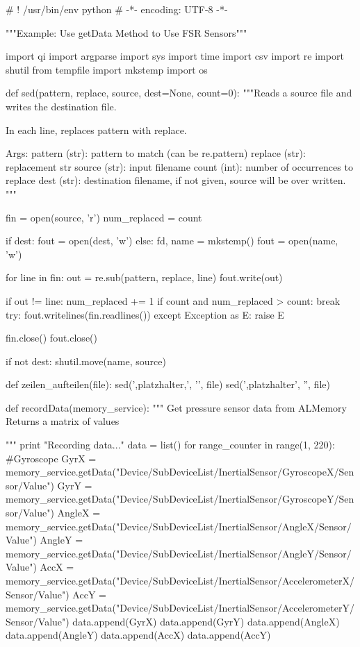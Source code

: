 	\begin{python} [caption={Pythonprogramm für Messaufnahmen}, label=Messungscode]
		# ! /usr/bin/env python
		# -*- encoding: UTF-8 -*-
		
		"""Example: Use getData Method to Use FSR Sensors"""
		
		import qi
		import argparse
		import sys
		import time
		import csv
		import re
		import shutil
		from tempfile import mkstemp
		import os
		
		def sed(pattern, replace, source, dest=None, count=0):
			"""Reads a source file and writes the destination file.
			
			In each line, replaces pattern with replace.
			
			Args:
			pattern (str): pattern to match (can be re.pattern)
			replace (str): replacement str
			source  (str): input filename
			count (int): number of occurrences to replace
			dest (str):   destination filename, if not given, source will be over written.
			"""
			
			fin = open(source, 'r')
			num_replaced = count
			
			if dest:
				fout = open(dest, 'w')
			else:
				fd, name = mkstemp()
				fout = open(name, 'w')
			
			for line in fin:
				out = re.sub(pattern, replace, line)
				fout.write(out)
				
				if out != line:
				num_replaced += 1
				if count and num_replaced > count:
				break
			try:
				fout.writelines(fin.readlines())
			except Exception as E:
				raise E
			
			fin.close()
			fout.close()
			
			if not dest:
				shutil.move(name, source)
		
		
		def zeilen_aufteilen(file):
			sed(',platzhalter,', '\n', file)
			sed(',platzhalter', '', file)
		
		
		def recordData(memory_service):
			""" Get pressure sensor data from ALMemory
			Returns a matrix of values
			
			"""
			print "Recording data..."
			data = list()
			for range_counter in range(1, 220):
		        #Gyroscope
				GyrX = memory_service.getData("Device/SubDeviceList/InertialSensor/GyroscopeX/Sensor/Value")
				GyrY = memory_service.getData("Device/SubDeviceList/InertialSensor/GyroscopeY/Sensor/Value")
				AngleX = memory_service.getData("Device/SubDeviceList/InertialSensor/AngleX/Sensor/Value")
				AngleY = memory_service.getData("Device/SubDeviceList/InertialSensor/AngleY/Sensor/Value")
				AccX = memory_service.getData("Device/SubDeviceList/InertialSensor/AccelerometerX/Sensor/Value")
				AccY = memory_service.getData("Device/SubDeviceList/InertialSensor/AccelerometerY/Sensor/Value")
				data.append(GyrX)
				data.append(GyrY)
				data.append(AngleX)
				data.append(AngleY)
				data.append(AccX)
				data.append(AccY)
				

\end{python}
